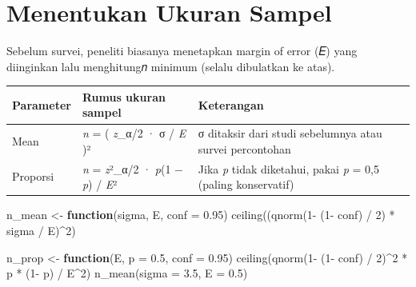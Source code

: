 \documentclass[
  indonesian,
  letterpaper,
]{book}
\newenvironment{Shaded}{\begin{snugshade}}{\end{snugshade}}
\newcommand{\AttributeTok}[1]{\textcolor[rgb]{0.40,0.45,0.13}{#1}}
\newcommand{\ControlFlowTok}[1]{\textcolor[rgb]{0.00,0.23,0.31}{\textbf{#1}}}
\newcommand{\DecValTok}[1]{\textcolor[rgb]{0.68,0.00,0.00}{#1}}
\newcommand{\FloatTok}[1]{\textcolor[rgb]{0.68,0.00,0.00}{#1}}
\newcommand{\FunctionTok}[1]{\textcolor[rgb]{0.28,0.35,0.67}{#1}}
\newcommand{\NormalTok}[1]{\textcolor[rgb]{0.00,0.23,0.31}{#1}}
\newcommand{\OtherTok}[1]{\textcolor[rgb]{0.00,0.23,0.31}{#1}}
\newcommand{\SpecialCharTok}[1]{\textcolor[rgb]{0.37,0.37,0.37}{#1}}
\newcounter{none} %
\begin{document}
\section{Menentukan Ukuran Sampel}\label{menentukan-ukuran-sampel}

Sebelum survei, peneliti biasanya menetapkan margin of error (𝐸) yang
diinginkan lalu menghitung𝑛 minimum (selalu dibulatkan ke atas).

{\def\LTcaptype{none} %
\begin{longtable}[]{@{}
  >{\raggedright\arraybackslash}p{}
  >{\raggedright\arraybackslash}p{}
  >{\raggedright\arraybackslash}p{}@{}}
\toprule\noalign{}
\begin{minipage}[b]{\linewidth}\raggedright
Parameter
\end{minipage} & \begin{minipage}[b]{\linewidth}\raggedright
Rumus ukuran sampel
\end{minipage} & \begin{minipage}[b]{\linewidth}\raggedright
Keterangan
\end{minipage} \\
\midrule\noalign{}
\endhead
\bottomrule\noalign{}
\endlastfoot
Mean & \emph{n} = ( \emph{z}\_α/2 · σ / \emph{E} )² & σ ditaksir dari
studi sebelumnya atau survei percontohan \\
Proporsi & \emph{n} = \emph{z}²\_α/2 · \emph{p}(1 − \emph{p}) /
\emph{E}² & Jika \emph{p} tidak diketahui, pakai \emph{p} = 0,5 (paling
konservatif) \\
\end{longtable}
}

\begin{Shaded}
\begin{Highlighting}[]
\NormalTok{n\_mean }\OtherTok{\textless{}{-}} \ControlFlowTok{function}\NormalTok{(sigma, E, }\AttributeTok{conf =} \FloatTok{0.95}\NormalTok{) }\FunctionTok{ceiling}\NormalTok{((}\FunctionTok{qnorm}\NormalTok{(}\DecValTok{1}\SpecialCharTok{{-}}\NormalTok{ (}\DecValTok{1}\SpecialCharTok{{-}}\NormalTok{ conf) }\SpecialCharTok{/} \DecValTok{2}\NormalTok{) }\SpecialCharTok{*}
\NormalTok{sigma }\SpecialCharTok{/}\NormalTok{ E)}\SpecialCharTok{\^{}}\DecValTok{2}\NormalTok{)}

\NormalTok{n\_prop }\OtherTok{\textless{}{-}} \ControlFlowTok{function}\NormalTok{(E, }\AttributeTok{p =} \FloatTok{0.5}\NormalTok{, }\AttributeTok{conf =} \FloatTok{0.95}\NormalTok{) }\FunctionTok{ceiling}\NormalTok{(}\FunctionTok{qnorm}\NormalTok{(}\DecValTok{1}\SpecialCharTok{{-}}\NormalTok{ (}\DecValTok{1}\SpecialCharTok{{-}}\NormalTok{ conf) }\SpecialCharTok{/} \DecValTok{2}\NormalTok{)}\SpecialCharTok{\^{}}\DecValTok{2} \SpecialCharTok{*}
\NormalTok{p }\SpecialCharTok{*}\NormalTok{ (}\DecValTok{1}\SpecialCharTok{{-}}\NormalTok{ p) }\SpecialCharTok{/}\NormalTok{ E}\SpecialCharTok{\^{}}\DecValTok{2}\NormalTok{)}
\FunctionTok{n\_mean}\NormalTok{(}\AttributeTok{sigma =} \FloatTok{3.5}\NormalTok{, }\AttributeTok{E =} \FloatTok{0.5}\NormalTok{)}
\end{Highlighting}
\end{Shaded}
\end{document}
